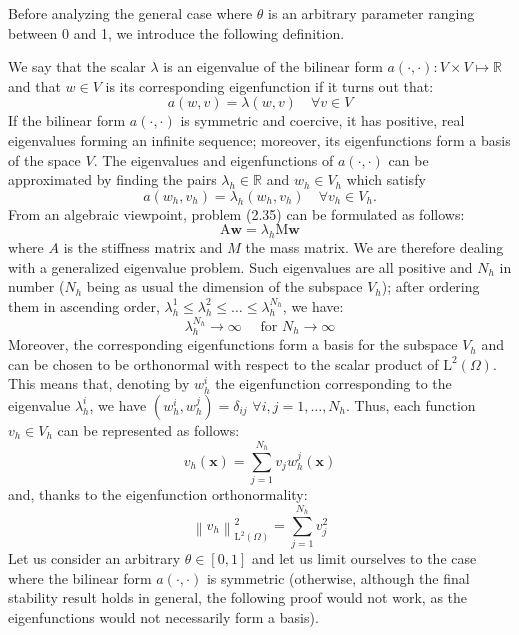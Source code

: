 \documentclass[11pt]{book}
\begin{document}
Before analyzing the general case where $\theta$ is an arbitrary parameter ranging between 0 and 1, we introduce the following definition.

We say that the scalar $\lambda$ is an eigenvalue of the bilinear form $a(\cdot, \cdot): V \times V \mapsto \mathbb{R}$ and that $w \in V$ is its corresponding eigenfunction if it turns out that:
$$
a(w, v)=\lambda(w, v) \quad \forall v \in V
$$
If the bilinear form $a(\cdot, \cdot)$ is symmetric and coercive, it has positive, real eigenvalues forming an infinite sequence; moreover, its eigenfunctions form a basis of the space $V$.
The eigenvalues and eigenfunctions of $a(\cdot, \cdot)$ can be approximated by finding the pairs $\lambda_{h} \in \mathbb{R}$ and $w_{h} \in V_{h}$ which satisfy
\begin{equation}
a\left(w_{h}, v_{h}\right)=\lambda_{h}\left(w_{h}, v_{h}\right) \quad \forall v_{h} \in V_{h} .
\end{equation}
From an algebraic viewpoint, problem (2.35) can be formulated as follows:
$$
\mathrm{A} \mathbf{w}=\lambda_{h} \mathrm{M} \mathbf{w}
$$
where $A$ is the stiffness matrix and $M$ the mass matrix. We are therefore dealing with a generalized eigenvalue problem.
Such eigenvalues are all positive and $N_{h}$ in number ($N_{h}$ being as usual the dimension of the subspace $V_{h}$); after ordering them in ascending order, $\lambda_{h}^{1} \leq \lambda_{h}^{2} \leq \ldots \leq \lambda_{h}^{N_{h}}$, we have:
$$
\lambda_{h}^{N_{h}} \rightarrow \infty \quad \text { for } N_{h} \rightarrow \infty
$$
Moreover, the corresponding eigenfunctions form a basis for the subspace $V_{h}$ and can be chosen to be orthonormal with respect to the scalar product of $\mathrm{L}^{2}(\Omega)$. This means that, denoting by $w_{h}^{i}$ the eigenfunction corresponding to the eigenvalue $\lambda_{h}^{i}$, we have $\left(w_{h}^{i}, w_{h}^{j}\right)=\delta_{i j}$ $\forall i, j=1, \ldots, N_{h}$.
Thus, each function $v_{h} \in V_{h}$ can be represented as follows:
$$
v_{h}(\mathbf{x})=\sum_{j=1}^{N_{h}} v_{j} w_{h}^{j}(\mathbf{x})
$$
and, thanks to the eigenfunction orthonormality:
\begin{equation}
    \left\|v_{h}\right\|_{\mathrm{L}^{2}(\Omega)}^{2}=\sum_{j=1}^{N_{h}} v_{j}^{2}
\end{equation}
Let us consider an arbitrary $\theta \in[0,1]$ and let us limit ourselves to the case where the bilinear form $a(\cdot, \cdot)$ is symmetric (otherwise, although the final stability result holds in general, the following proof would not work, as the eigenfunctions would not necessarily form a basis).
\end{document}
